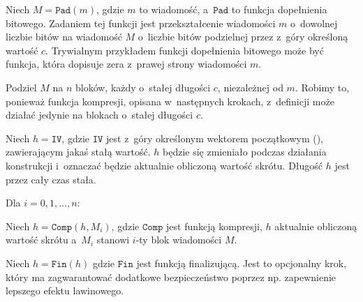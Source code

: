 \begin{myenumerate}

    \item Niech $M = \mathtt{Pad}(m)$, gdzie $m$ to wiadomość, a~$\mathtt{Pad}$
    to funkcja dopełnienia bitowego. Zadaniem tej funkcji jest przekształcenie
    wiadomości $m$ o~dowolnej liczbie bitów na wiadomość $M$ o~liczbie bitów
    podzielnej przez z~góry określoną wartość $c$. Trywialnym przykładem
    funkcji dopełnienia bitowego może być funkcja, która dopisuje zera z~prawej
    strony wiadomości $m$.

    \item Podziel $M$ na $n$ bloków, każdy o~stałej długości $c$, niezależnej
    od $m$. Robimy to, ponieważ funkcja kompresji, opisana w~następnych
    krokach, z~definicji może działać jedynie na blokach o~stałej długości $c$.

    \item Niech $h = \mathtt{IV}$, gdzie $\mathtt{IV}$ jest z~góry określonym
    wektorem początkowym (), zawierającym jakaś stałą
    wartość. $h$ będzie się zmieniało podczas działania konstrukcji i~oznaczać
    będzie aktualnie obliczoną wartość skrótu. Długość $h$ jest przez cały czas
    stała.

    \item Dla $i = 0, 1, \ldots, n$:

    \begin{myenumerate}

        \item Niech $h=\mathtt{Comp}(h,M_i)$, gdzie $\mathtt{Comp}$ jest
        funkcją kompresji, $h$ aktualnie obliczoną wartość skrótu a~$M_i$
        stanowi $i$-ty blok wiadomości $M$.

    \end{myenumerate}

    \item Niech $h=\mathtt{Fin}(h)$ gdzie $\mathtt{Fin}$ jest funkcją
    finalizującą. Jest to opcjonalny krok, który ma zagwarantować dodatkowe
    bezpieczeństwo poprzez np. zapewnienie lepszego efektu lawinowego.

\end{myenumerate}


